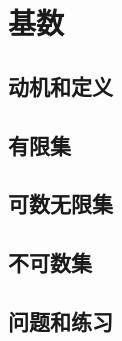 \section{基数}

\subsection{动机和定义}

\subsection{有限集}

\subsection{可数无限集}\label{sec:section7.6.3}

\subsection{不可数集}

\subsection{问题和练习}